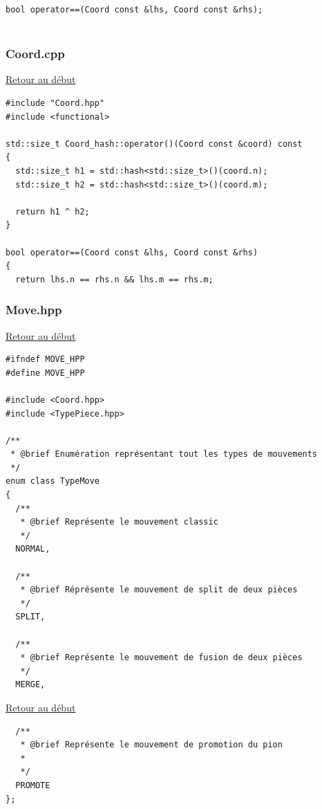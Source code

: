 {\begin{frame}[fragile]
\begin{verbatim}
bool operator==(Coord const &lhs, Coord const &rhs);


\end{verbatim}
\end{frame}

\begin{frame}[fragile]
\label{Coord.cpp}
\frametitle{Coord.cpp}
\hyperlink{conclusion}{Retour au début}\newline
\begin{verbatim}
#include "Coord.hpp"
#include <functional>

std::size_t Coord_hash::operator()(Coord const &coord) const
{
  std::size_t h1 = std::hash<std::size_t>()(coord.n);
  std::size_t h2 = std::hash<std::size_t>()(coord.m);

  return h1 ^ h2;
}

bool operator==(Coord const &lhs, Coord const &rhs)
{
  return lhs.n == rhs.n && lhs.m == rhs.m;

\end{verbatim}
\end{frame}

\begin{frame}[fragile]
\label{Move.hpp}
\frametitle{Move.hpp}
\hyperlink{conclusion}{Retour au début}\newline
\begin{verbatim}
#ifndef MOVE_HPP
#define MOVE_HPP

#include <Coord.hpp>
#include <TypePiece.hpp>

/**
 * @brief Enumération représentant tout les types de mouvements
 */
enum class TypeMove
{
  /**
   * @brief Représente le mouvement classic
   */
  NORMAL,

  /**
   * @brief Réprésente le mouvement de split de deux pièces
   */
  SPLIT,

  /**
   * @brief Représente le mouvement de fusion de deux pièces
   */
  MERGE,

\end{verbatim}
\end{frame}

\begin{frame}[fragile]
\hyperlink{conclusion}{Retour au début}\newline
\begin{verbatim}
  /**
   * @brief Représente le mouvement de promotion du pion
   *
   */
  PROMOTE
};


\end{verbatim}
\end{frame}}
